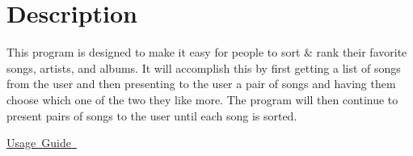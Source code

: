 \hypertarget{index_descriptionMainPage}{}\section{Description}\label{index_descriptionMainPage}
This program is designed to make it easy for people to sort \& rank their favorite songs, artists, and albums. It will accomplish this by first getting a list of songs from the user and then presenting to the user a pair of songs and having them choose which one of the two they like more. The program will then continue to present pairs of songs to the user until each song is sorted.

\mbox{\hyperlink{usage_guide}{Usage Guide }} 